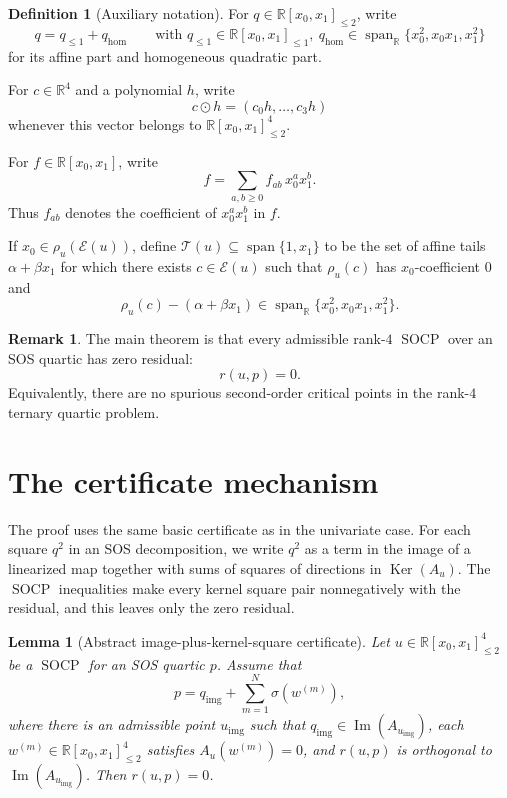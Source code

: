 \documentclass[10pt]{article}
\newtheorem{lemma}[theorem]{Lemma}
\theoremstyle{definition}
\newtheorem{definition}[theorem]{Definition}
\newtheorem{remark}[theorem]{Remark}
\newcommand{\R}{\mathbb{R}}
\newcommand{\Poly}{\R[x_0,x_1]}
\newcommand{\Quad}{\Poly_{\le 2}}
\newcommand{\Aff}{\Poly_{\le 1}}
\newcommand{\HomQ}{\operatorname{span}_{\R}\{x_0^2,x_0x_1,x_1^2\}}
\DeclareMathOperator{\mspan}{span}
\DeclareMathOperator{\imag}{Im}
\DeclareMathOperator{\kernel}{Ker}
\newcommand{\im}{\imag}
\newcommand{\Ker}{\kernel}
\newcommand{\SOCP}{\operatorname{SOCP}}
\newcommand{\sig}{\sigma}
\newcommand{\rel}{\rho}
\newcommand{\Exact}{\mathcal{E}}
\newcommand{\Tail}{\mathcal{T}}
\begin{document}
\begin{definition}[Auxiliary notation]
\label{def:aux-notation}
For \(q\in \Quad\), write
\[
  q=q_{\le 1}+q_{\mathrm{hom}}
  \qquad\text{with }q_{\le 1}\in \Aff,\ q_{\mathrm{hom}}\in \HomQ
\]
for its affine part and homogeneous quadratic part.

For \(c\in \R^4\) and a polynomial \(h\), write
\[
  c\odot h=(c_0h,\dots,c_3h)
\]
whenever this vector belongs to \(\Quad^4\).

For \(f\in \Poly\), write
\[
  f=\sum_{a,b\ge 0} f_{ab}\,x_0^a x_1^b.
\]
Thus \(f_{ab}\) denotes the coefficient of \(x_0^a x_1^b\) in \(f\).

If \(x_0\in \rel_u(\Exact(u))\), define \(\Tail(u)\subseteq \mspan\{1,x_1\}\)
to be the set of affine tails \(\alpha+\beta x_1\) for which there exists
\(c\in \Exact(u)\) such that \(\rel_u(c)\) has \(x_0\)-coefficient \(0\) and
\[
  \rel_u(c)-(\alpha+\beta x_1)\in \HomQ.
\]
\end{definition}

\begin{remark}\label{rem:goal}
The main theorem is that every admissible rank-$4$ \(\SOCP\) over an SOS
quartic has zero residual:
\[
  r(u,p)=0.
\]
Equivalently, there are no spurious second-order critical points in the
rank-$4$ ternary quartic problem.
\end{remark}

\section{The certificate mechanism}\label{sec:certificate}
The proof uses the same basic certificate as in the univariate case. For each
square \(q^2\) in an SOS decomposition, we write \(q^2\) as a term in the image
of a linearized map together with sums of squares of directions in
\(\Ker(A_u)\). The \(\SOCP\) inequalities make every kernel square pair
nonnegatively with the residual, and this leaves only the zero residual.

\begin{lemma}[Abstract image-plus-kernel-square certificate]
\label{lem:certificate}
Let \(u\in \Quad^4\) be a \(\SOCP\) for an SOS quartic \(p\). Assume that
\[
  p=q_{\mathrm{img}}+\sum_{m=1}^N \sig(w^{(m)}),
\]
where there is an admissible point \(u_{\mathrm{img}}\) such that
\(q_{\mathrm{img}}\in \im(A_{u_{\mathrm{img}}})\), each
\(w^{(m)}\in \Quad^4\) satisfies \(A_u(w^{(m)})=0\), and \(r(u,p)\) is
orthogonal to \(\im(A_{u_{\mathrm{img}}})\). Then \(r(u,p)=0\).
\end{lemma}
\end{document}
